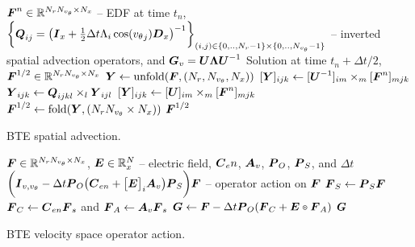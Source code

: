 \begin{algorithm}[!tbhp]
	\begin{algorithmic}[1]
		\Require $\boldsymbol{F}^n\in \mathbb{R}^{N_rN_{v_{\theta}} \times N_x}$ -- EDF at time $t_n$, \nonumber\\
		$\biggl\{\boldsymbol{Q}_{ij} = \left(\boldsymbol{I}_x + \frac{1}{2} \Delta t \Lambda_i \cos({v_{\theta}}_j) \boldsymbol{D}_x \right)^{-1}\biggr\}_{(i,j)\in \{0,..,N_r-1\}\times\{0,..,N_{v_{\theta}}-1\}}$ -- inverted spatial advection operators, and $\boldsymbol{G}_v = \boldsymbol{U} \boldsymbol{\Lambda} \boldsymbol{U}^{-1}$
		\Ensure Solution at time $t_n + \Delta t/2$, $\boldsymbol{F}^{1/2} \in \mathbb{R}^{N_r N_{v_{\theta}} \times N_x}$ 
		\State $\boldsymbol{Y} \leftarrow \text{unfold}(\boldsymbol{F}, (N_r, N_{v_{\theta}}, N_x))$ 
		\State $[\boldsymbol{Y}]_{ijk} \leftarrow [\boldsymbol{U}^{-1}]_{im} \times_{m} [\boldsymbol{F}^n]_{mjk}$ 
		\State $\boldsymbol{Y}_{ijk} \leftarrow \boldsymbol{Q}_{ijkl} \times_l \boldsymbol{Y}_{ijl}$ 
		\EndFor
		\EndFor
		\State $[\boldsymbol{Y}]_{ijk} \leftarrow [\boldsymbol{U}]_{im} \times_{m} [\boldsymbol{F}^n]_{mjk}$ 
		\State $\boldsymbol{F}^{1/2} \leftarrow \text{fold}(\boldsymbol{Y} , (N_rN_{v_{\theta}} \times N_x))$ 
		\State \Return $\boldsymbol{F}^{1/2}$
	\end{algorithmic}
	\caption{BTE spatial advection. \label{alg:bte_spatial_adv}}
\end{algorithm}
\begin{algorithm}
	\begin{algorithmic}[1]
		\Require $\boldsymbol{F} \in \mathbb{R}^{N_r N_{v_{\theta}} \times N_x}$, $\boldsymbol{E} \in \mathbb{R}^N_x$ -- electric field, $\boldsymbol{C}_en$, $\boldsymbol{A}_v$, $\boldsymbol{P}_O$, $\boldsymbol{P}_S$, and $\Delta t$
		\Ensure $\biggl(\vect{I}_{v,\vtheta} -\Delta t \vect P_{O}\of{\vect C_{en}  + \bigl[\vect{E}\bigr]_{i} \vect A_v  }  \vect P_{S}\biggr) \vect F$ -- operator action on $\boldsymbol{F}$
		\State $\boldsymbol{F}_S \leftarrow \boldsymbol{P}_S \boldsymbol{F}$
		\State $\boldsymbol{F}_C \leftarrow \boldsymbol{C}_{en} \boldsymbol{F}_s$ \quad and \quad $\boldsymbol{F}_A \leftarrow \boldsymbol{A}_v \boldsymbol{F}_s$
		\State $\vect G  \leftarrow  \vect F - \Delta t \vect P_O \of{\vect F_C + \vect E \pdot \vect F_A}$
		\State \Return $\boldsymbol{G}$
	\end{algorithmic}
	\caption{BTE velocity space operator action. \label{alg:vspace_action}}
\end{algorithm}
